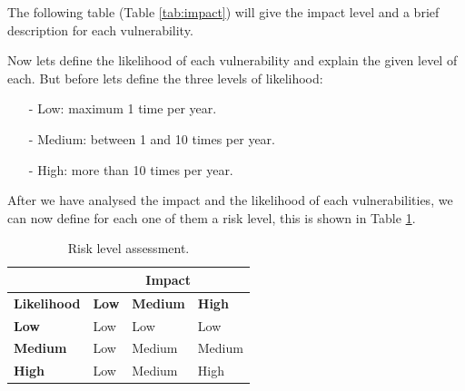 \documentclass[a4paper,10pt]{article}
\begin{document}
The following table (Table \ref{tab:impact}) will give the impact level and a brief description for each vulnerability.


Now lets define the likelihood of each vulnerability and explain the given level of each. But before lets define the three levels of likelihood:
\begin{enumerate}
\item[-] Low: maximum 1 time per year.
\item[-] Medium: between 1 and 10 times per year.
\item[-] High: more than 10 times per year.
\end{enumerate}



After we have analysed the impact and the likelihood of each vulnerabilities, we can now define for each one of them a risk level, this is shown in Table \ref{tab:risk}.

\begin{table}[!h]
	\centering
	\begin{tabular}{|l|l|l|l|}
		\hline
		 & \multicolumn{3}{|c|}{\textbf{Impact}}  \\ \hline
		\textbf{Likelihood} & \textbf{Low} & \textbf{Medium} & \textbf{High} \\ \hline
		\textbf{Low}& \cellcolor{green}Low & \cellcolor{green}Low & \cellcolor{green}Low \\ \hline
		\textbf{Medium} & \cellcolor{green}Low & \cellcolor{yellow}Medium & \cellcolor{yellow}Medium \\ \hline
		\textbf{High} & \cellcolor{green}Low & \cellcolor{yellow}Medium & \cellcolor{red} High \\ \hline
	\end{tabular}
	\caption{Risk level assessment.}
	\label{tab:risk}
\end{table} 
\end{document}
